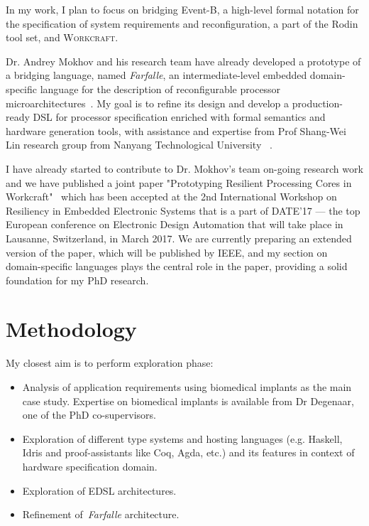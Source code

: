 \documentclass[10pt, a4paper]{article}
\begin{document}
In my work, I plan to focus on bridging Event-B, a high-level formal notation
for the specification of system requirements 
and reconfiguration, a part of the Rodin tool set, and \textsc{Workcraft}. 

Dr. Andrey Mokhov and his research team have already developed a prototype of a
bridging language, named \emph{Farfalle}, an intermediate-level embedded
domain-specific language for the description of reconfigurable processor
microarchitectures~\cite{WorkraftREES}. My goal is to refine its design and
develop a production-ready DSL for processor specification enriched with
formal semantics and hardware generation tools, with assistance and expertise 
from Prof Shang-Wei Lin research group from Nanyang Technological University
~\cite{Lin:2014:CSC:2962288.2962317}.  

I have already started to contribute to Dr. Mokhov's team on-going research
work and we have published a joint paper "Prototyping Resilient Processing Cores
in Workcraft"~\cite{WorkraftREES} which has been accepted at the 2nd 
International Workshop on Resiliency in Embedded Electronic Systems that is a
part of DATE'17 --- the top European conference on Electronic Design Automation
that will take place in Lausanne, Switzerland, in March 2017. We are currently
preparing an extended version of the paper, which will be published by IEEE,
and my section on domain-specific languages plays the central role in the paper,
providing a solid foundation for my PhD research.

\section{Methodology}

My closest aim is to perform exploration phase: 

\begin{itemize} 
\item Analysis of application requirements using biomedical implants as the main
case study. Expertise on biomedical implants is available from Dr Degenaar, one
of the PhD co-supervisors.
\item Exploration of different type systems and hosting languages 
(e.g. Haskell, Idris and proof-assistants like Coq, Agda, etc.) and its 
features in context of hardware specification domain.
\item Exploration of EDSL architectures.
\item Refinement of~\emph{Farfalle} architecture.
\end{itemize}
\end{document}
